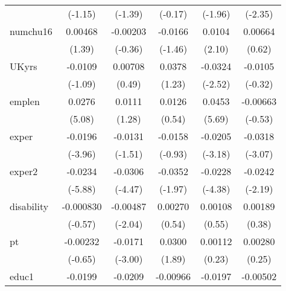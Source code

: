 \begin{table}[htbp]
\begin{tabular}{l*{5}{c}}
            &     (-1.15)         &     (-1.39)         &     (-0.17)         &     (-1.96)         &     (-2.35)         \\
numchu16    &     0.00468         &    -0.00203         &     -0.0166         &      0.0104\sym{*}  &     0.00664         \\
            &      (1.39)         &     (-0.36)         &     (-1.46)         &      (2.10)         &      (0.62)         \\
UKyrs       &     -0.0109         &     0.00708         &      0.0378         &     -0.0324\sym{*}  &     -0.0105         \\
            &     (-1.09)         &      (0.49)         &      (1.23)         &     (-2.52)         &     (-0.32)         \\
emplen      &      0.0276\sym{***}&      0.0111         &      0.0126         &      0.0453\sym{***}&    -0.00663         \\
            &      (5.08)         &      (1.28)         &      (0.54)         &      (5.69)         &     (-0.53)         \\
exper       &     -0.0196\sym{***}&     -0.0131         &     -0.0158         &     -0.0205\sym{**} &     -0.0318\sym{**} \\
            &     (-3.96)         &     (-1.51)         &     (-0.93)         &     (-3.18)         &     (-3.07)         \\
exper2      &     -0.0234\sym{***}&     -0.0306\sym{***}&     -0.0352\sym{*}  &     -0.0228\sym{***}&     -0.0242\sym{*}  \\
            &     (-5.88)         &     (-4.47)         &     (-1.97)         &     (-4.38)         &     (-2.19)         \\
disability  &   -0.000830         &    -0.00487\sym{*}  &     0.00270         &     0.00108         &     0.00189         \\
            &     (-0.57)         &     (-2.04)         &      (0.54)         &      (0.55)         &      (0.38)         \\
pt          &    -0.00232         &     -0.0171\sym{**} &      0.0300         &     0.00112         &     0.00280         \\
            &     (-0.65)         &     (-3.00)         &      (1.89)         &      (0.23)         &      (0.25)         \\
educ1       &     -0.0199\sym{***}&     -0.0209\sym{***}&    -0.00966         &     -0.0197\sym{***}&    -0.00502         \\

\end{tabular}
\end{table}
